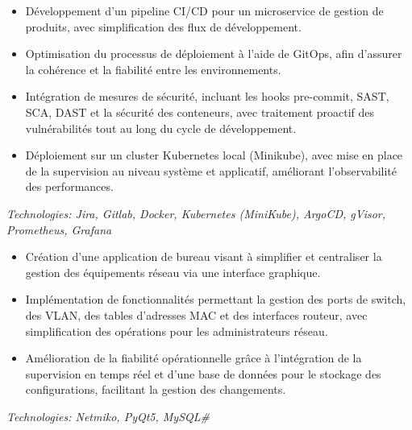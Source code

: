 \vspace{-1.5mm}
\begin{itemize}
    \small
    \setlength\itemsep{0cm}
    \item Développement d’un pipeline CI/CD pour un microservice de gestion de produits, avec simplification des flux de développement.
    \item Optimisation du processus de déploiement à l’aide de GitOps, afin d’assurer la cohérence et la fiabilité entre les environnements.
    \item Intégration de mesures de sécurité, incluant les hooks pre-commit, SAST, SCA, DAST et la sécurité des conteneurs, avec traitement proactif des vulnérabilités tout au long du cycle de développement.
    \item Déploiement sur un cluster Kubernetes local (Minikube), avec mise en place de la supervision au niveau système et applicatif, améliorant l’observabilité des performances.
\end{itemize}
\textit{Technologies: Jira, Gitlab, Docker, Kubernetes (MiniKube), ArgoCD, gVisor, Prometheus, Grafana}
\vspace{2mm}

\begin{itemize}
    \small
    \setlength\itemsep{0cm}
    \item Création d’une application de bureau visant à simplifier et centraliser la gestion des équipements réseau via une interface graphique.
    \item Implémentation de fonctionnalités permettant la gestion des ports de switch, des VLAN, des tables d’adresses MAC et des interfaces routeur, avec simplification des opérations pour les administrateurs réseau.
    \item Amélioration de la fiabilité opérationnelle grâce à l’intégration de la supervision en temps réel et d’une base de données pour le stockage des configurations, facilitant la gestion des changements.
\end{itemize}
\textit{Technologies: Netmiko, PyQt5, MySQL\#}
\medskip

